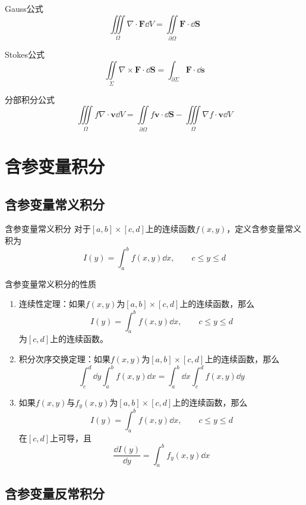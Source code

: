 \documentclass[lang = cn, scheme = chinese, thmcnt = section]{elegantbook}
\newcommand{\bs}{\boldsymbol}          %
\newcommand{\IInt}{\iint\limits}
\newcommand{\IIInt}{\iiint\limits}
\begin{document}
\begin{theorem}{Gauss公式}
	$$
	\IIInt_\Omega\nabla\cdot \bs{F}\dd V
	=\IInt_{\partial\Omega}\bs{F}\cdot \dd\bs{S}
	$$
\end{theorem}

\begin{theorem}{Stokes公式}
	$$
	\IInt_\Sigma\nabla\times \bs{F}\cdot \dd\bs{S}
	=\int_{\partial\Sigma}\bs{F}\cdot \dd\bs{s}
	$$
\end{theorem}

\begin{theorem}{分部积分公式}
	$$
	\IIInt_\Omega f\nabla\cdot\bs{v}\dd V
	=\IInt_{\partial\Omega}f\bs{v}\cdot\dd\bs{S}-\IIInt_\Omega\nabla f\cdot\bs{v}\dd V
	$$
\end{theorem}

\chapter{含参变量积分}

\section{含参变量常义积分}

\begin{definition}{含参变量常义积分}
	对于$[a,b]\times [c,d]$上的连续函数$f(x,y)$，定义含参变量常义积为
	$$
	I(y)=\int_{a}^{b}f(x,y)\dd x,\qquad c\le y \le d
	$$
\end{definition}

\begin{proposition}{含参变量常义积分的性质}
	\begin{enumerate}
		\item 连续性定理：如果$f(x,y)$为$[a,b]\times [c,d]$上的连续函数，那么
		$$
		I(y)=\int_{a}^{b}f(x,y)\dd x,\qquad c\le y \le d
		$$
		为$[c,d]$上的连续函数。
		\item 积分次序交换定理：如果$f(x,y)$为$[a,b]\times [c,d]$上的连续函数，那么
		$$
		\int_{c}^{d}\dd y\int_{a}^{b}f(x,y)\dd x
		=
		\int_{a}^{b}\dd x\int_{c}^{d}f(x,y)\dd y
		$$
		\item 如果$f(x,y)$与$f_y(x,y)$为$[a,b]\times [c,d]$上的连续函数，那么
		$$
		I(y)=\int_{a}^{b}f(x,y)\dd x,\qquad c\le y \le d
		$$
		在$[c,d]$上可导，且
		$$
		\frac{\dd I(y)}{\dd y}=\int_{a}^{b}f_y(x,y)\dd x
		$$
	\end{enumerate}
\end{proposition}

\section{含参变量反常积分}
\end{document}

